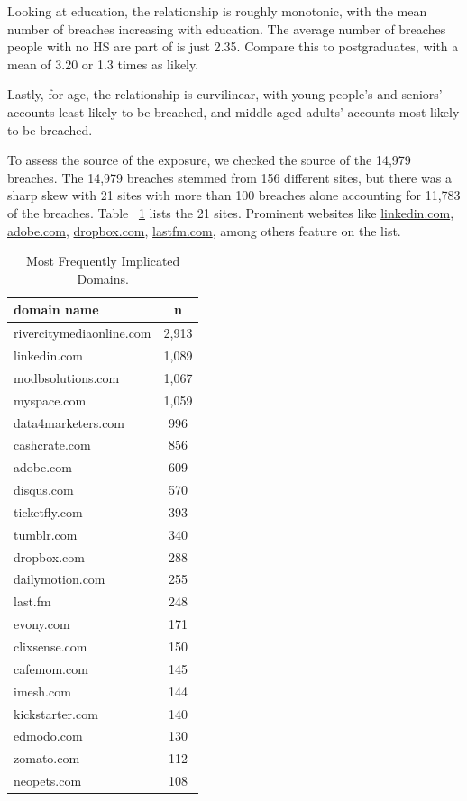 \documentclass[12pt, letterpaper]{article}
\begin{document}


Looking at education, the relationship is roughly monotonic, with the mean number of breaches increasing with education. The average number of breaches people with no HS are part of is just 2.35. Compare this to postgraduates, with a mean of 3.20 or 1.3 times as likely.

Lastly, for age, the relationship is curvilinear, with young people's and seniors' accounts least likely to be breached, and middle-aged adults' accounts most likely to be breached.

To assess the source of the exposure, we checked the source of the 14,979 breaches. The 14,979 breaches stemmed from 156 different sites, but there was a sharp skew with 21 sites with more than 100 breaches alone accounting for 11,783 of the breaches. Table ~\ref{table:domain_dat} lists the 21 sites. Prominent websites like \url{linkedin.com}, \url{adobe.com}, \url{dropbox.com}, \url{lastfm.com}, among others feature on the list. 

\begin{table}[h!]
\centering
\caption{Most Frequently Implicated Domains.}
\begin{tabular}{ l c }
\hline    
domain name & n \\
\hline
rivercitymediaonline.com &   2,913 \\
linkedin.com             &   1,089 \\
modbsolutions.com        &   1,067\\
myspace.com              &   1,059\\
data4marketers.com       &    996\\
cashcrate.com            &    856\\
adobe.com                &    609\\
disqus.com               &    570\\
ticketfly.com            &    393\\
tumblr.com               &    340\\
dropbox.com              &    288\\
dailymotion.com          &    255\\
last.fm                  &    248\\
evony.com                &    171\\
clixsense.com            &    150\\
cafemom.com              &    145\\
imesh.com                &    144\\
kickstarter.com          &    140\\
edmodo.com               &    130\\
zomato.com               &    112\\
neopets.com              &    108\\
\hline
\end{tabular}
\label{table:domain_dat}
\end{table}
\end{document}
